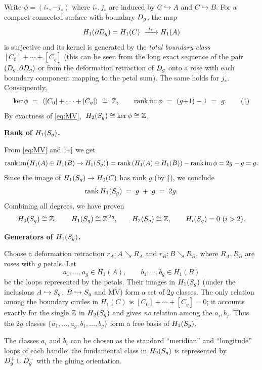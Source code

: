 \begin{solution}
Write $\phi=(i_*, -j_*)$ where $i_*,j_*$ are induced by $C\hookrightarrow A$ and $C\hookrightarrow B$.
For a compact connected surface with boundary $D_g$, the map
\[
H_1(\partial D_g)=H_1(C)\ \xrightarrow{\ i_*\ } H_1(A)
\]
is surjective and its kernel is generated by the \emph{total boundary class}
\(
[C_0]+\cdots+[C_g]
\)
(this can be seen from the long exact sequence of the pair $(D_g,\partial D_g)$ or
from the deformation retraction of $D_g$ onto a rose with each boundary component
mapping to the petal sum). The same holds for $j_*$. Consequently,
\[
\ker \phi \ =\ \langle [C_0]+\cdots+[C_g]\rangle \ \cong\ \mathbb{Z},
\qquad \mathrm{rank}\,\mathrm{im}\,\phi\ =\ (g{+}1)-1\ =\ g.
\tag{$\ddagger$}
\]
By exactness of \eqref{eq:MV}, \(\;H_2(S_g)\cong \ker\phi\cong \mathbb{Z}\).

\medskip\noindent\textbf{Rank of $H_1(S_g)$.}

From \eqref{eq:MV} and $\ddagger$–$\ddagger$ we get
\[
\mathrm{rank}\,\mathrm{im}\big(H_1(A)\oplus H_1(B)\to H_1(S_g)\big)
= \mathrm{rank}\,(H_1(A)\oplus H_1(B)) - \mathrm{rank}\,\mathrm{im}\,\phi
= 2g - g = g.
\]
Since the image of $H_1(S_g)\to H_0(C)$ has rank $g$ (by $\ddagger$),
we conclude
\[
\mathrm{rank}\,H_1(S_g) \;=\; g \;+\; g \;=\; 2g.
\]
Combining all degrees, we have proven
\[
H_0(S_g)\cong \mathbb{Z},\qquad H_1(S_g)\cong \mathbb{Z}^{\,2g},\qquad H_2(S_g)\cong \mathbb{Z},
\qquad H_i(S_g)=0\ (i>2).
\]

\medskip\noindent\textbf{Generators of $H_1(S_g)$.}

Choose a deformation retraction $r_A:A\searrow R_A$ and $r_B:B\searrow R_B$,
where $R_A,R_B$ are roses with $g$ petals. Let
\[
a_1,\dots,a_g \in H_1(A),\qquad b_1,\dots,b_g\in H_1(B)
\]
be the loops represented by the petals. Their images in $H_1(S_g)$ (under the
inclusions $A\hookrightarrow S_g$, $B\hookrightarrow S_g$ and MV)
form a set of $2g$ classes. The only relation among the boundary
circles in $H_1(C)$ is $[C_0]+\cdots+[C_g]=0$; it accounts exactly for the single
$\mathbb{Z}$ in $H_2(S_g)$ and gives \emph{no} relation among the $a_i,b_j$.
Thus the $2g$ classes $\{a_1,\dots,a_g,b_1,\dots,b_g\}$ form a free basis of $H_1(S_g)$.
\end{solution}

\begin{remark}
The classes $a_i$ and $b_i$ can be chosen as the standard ``meridian'' and
``longitude'' loops of each handle; the fundamental class in $H_2(S_g)$ is represented by
$D_g^+\cup D_g^-$ with the gluing orientation.
\end{remark}

